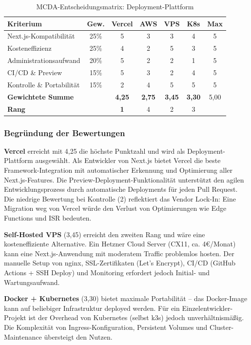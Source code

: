 \begin{table}[htbp]
\centering
\caption{MCDA-Entscheidungsmatrix: Deployment-Plattform}
\label{tab:mcda-deployment}
\begin{tabular}{lc|cccc|c}
\toprule
\textbf{Kriterium} & \textbf{Gew.} & \textbf{Vercel} & \textbf{AWS} & \textbf{VPS} & \textbf{K8s} & \textbf{Max} \\
\midrule
Next.js-Kompatibilität & 25\% & 5 & 3 & 3 & 4 & 5 \\
Kosteneffizienz & 25\% & 4 & 2 & 5 & 3 & 5 \\
Administrationsaufwand & 20\% & 5 & 2 & 2 & 1 & 5 \\
CI/CD \& Preview & 15\% & 5 & 3 & 2 & 4 & 5 \\
Kontrolle \& Portabilität & 15\% & 2 & 4 & 5 & 5 & 5 \\
\midrule
\textbf{Gewichtete Summe} & & \textbf{4,25} & \textbf{2,75} & \textbf{3,45} & \textbf{3,30} & 5,00 \\
\textbf{Rang} & & \textbf{1} & 4 & 2 & 3 & \\
\bottomrule
\end{tabular}
\end{table}

\subsubsection{Begründung der Bewertungen}

\textbf{Vercel} erreicht mit 4,25 die höchste Punktzahl und wird als Deployment-Plattform ausgewählt. Als Entwickler von Next.js bietet Vercel die beste Framework-Integration mit automatischer Erkennung und Optimierung aller Next.js-Features. Die Preview-Deployment-Funktionalität unterstützt den agilen Entwicklungsprozess durch automatische Deployments für jeden Pull Request. Die niedrige Bewertung bei Kontrolle (2) reflektiert das Vendor Lock-In: Eine Migration weg von Vercel würde den Verlust von Optimierungen wie Edge Functions und \ac{ISR} bedeuten.

\textbf{Self-Hosted VPS} (3,45) erreicht den zweiten Rang und wäre eine kosteneffiziente Alternative. Ein Hetzner Cloud Server (CX11, ca. 4€/Monat) kann eine Next.js-Anwendung mit moderatem Traffic problemlos hosten. Der manuelle Setup von nginx, SSL-Zertifikaten (Let's Encrypt), CI/CD (GitHub Actions + SSH Deploy) und Monitoring erfordert jedoch Initial- und Wartungsaufwand.

\textbf{Docker + Kubernetes} (3,30) bietet maximale Portabilität – das Docker-Image kann auf beliebiger Infrastruktur deployed werden. Für ein Einzelentwickler-Projekt ist der Overhead von Kubernetes (selbst k3s) jedoch unverhältnismäßig. Die Komplexität von Ingress-Konfiguration, Persistent Volumes und Cluster-Maintenance übersteigt den Nutzen.

